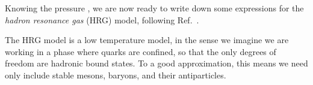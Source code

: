 Knowing the pressure , we are now ready to write down
some expressions for the {\it hadron resonance gas} (HRG) model,
following Ref.~\cite{karsch_probing_2011}.

The HRG model is a low temperature model, in the sense we imagine we are working
in a phase where quarks are confined, so that the only degrees of freedom are
hadronic bound states. To a good approximation, this means we need only include
stable mesons, baryons, and their antiparticles.



